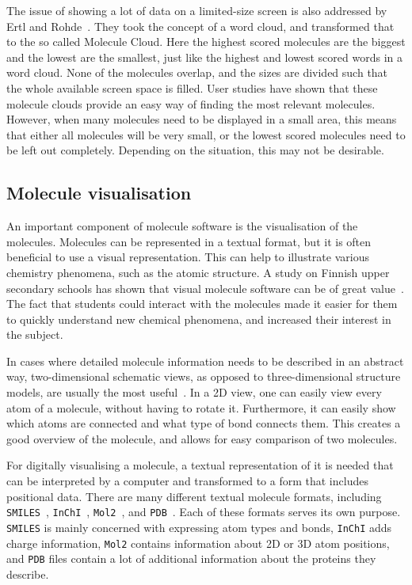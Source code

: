 The issue of showing a lot of data on a limited-size screen is also addressed by Ertl and Rohde~\cite{ertl2012molecule}. They took the concept of a word cloud, and transformed that to the so called Molecule Cloud. Here the highest scored molecules are the biggest and the lowest are the smallest, just like the highest and lowest scored words in a word cloud. None of the molecules overlap, and the sizes are divided such that the whole available screen space is filled. User studies have shown that these molecule clouds provide an easy way of finding the most relevant molecules. However, when many molecules need to be displayed in a small area, this means that either all molecules will be very small, or the lowest scored molecules need to be left out completely. Depending on the situation, this may not be desirable.


\subsection{Molecule visualisation}
An important component of molecule software is the visualisation of the molecules. Molecules can be represented in a textual format, but it is often beneficial to use a visual representation. This can help to illustrate various chemistry phenomena, such as the atomic structure. A study on Finnish upper secondary schools has shown that visual molecule software can be of great value~\cite{aksela2008computer}. The fact that students could interact with the molecules made it easier for them to quickly understand new chemical phenomena, and increased their interest in the subject.

In cases where detailed molecule information needs to be described in an abstract way, two-dimensional schematic views, as opposed to three-dimensional structure models, are usually the most useful~\cite{zhou2009molecular}. In a 2D view, one can easily view every atom of a molecule, without having to rotate it. Furthermore, it can easily show which atoms are connected and what type of bond connects them. This creates a good overview of the molecule, and allows for easy comparison of two molecules.

For digitally visualising a molecule, a textual representation of it is needed that can be interpreted by a computer and transformed to a form that includes positional data. There are many different textual molecule formats, including \verb|SMILES|~\cite{daylight1992daylight}, \verb|InChI|~\cite{heller2013inchi}, \verb|Mol2|~\cite{tripos2005tripos}, and \verb|PDB|~\cite{bernstein1977protein}. Each of these formats serves its own purpose. \verb|SMILES| is mainly concerned with expressing atom types and bonds, \verb|InChI| adds charge information, \verb|Mol2| contains information about 2D or 3D atom positions, and \verb|PDB| files contain a lot of additional information about the proteins they describe.

